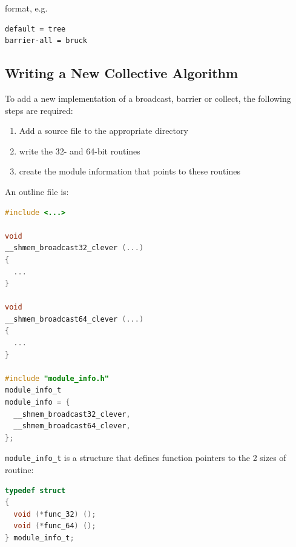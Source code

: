 \documentclass[english]{article}
\begin{document}
format, e.g.\

\begin{lstlisting}
default = tree
barrier-all = bruck
\end{lstlisting}

\subsection{Writing a New Collective Algorithm}

To add a new implementation of a broadcast, barrier or collect, the
following steps are required:

\begin{enumerate}
\item Add a source file to the appropriate directory
\item write the 32- and 64-bit routines
\item create the module information that points to these routines
\end{enumerate}

\noindent
An outline file is:

\vspace{0.1in}
\begin{minipage}{0.75\linewidth}
\begin{lstlisting}[language=C,caption={Outline of broadcast implementation}]
#include <...>

void
__shmem_broadcast32_clever (...)
{
  ...
}

void
__shmem_broadcast64_clever (...)
{
  ...
}

#include "module_info.h"
module_info_t
module_info = {
  __shmem_broadcast32_clever,
  __shmem_broadcast64_clever,
};
\end{lstlisting}
\end{minipage}
\vspace{0.1in}

\noindent
\texttt{module\_info\_t} is a structure that defines function pointers
to the 2 sizes of routine:

\vspace{0.1in}
\begin{minipage}{0.75\linewidth}
\begin{lstlisting}[language=C,caption={Definition of module structure}]
typedef struct
{
  void (*func_32) ();
  void (*func_64) ();
} module_info_t;
\end{lstlisting}
\end{minipage}
\vspace{0.1in}
\end{document}
